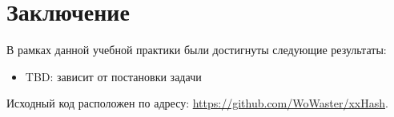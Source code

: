 
\section*{Заключение}
В рамках данной учебной практики были достигнуты следующие результаты:
\begin{itemize}
	\item TBD: зависит от постановки задачи
\end{itemize}

Исходный код расположен по адресу: \url{https://github.com/WoWaster/xxHash}.
